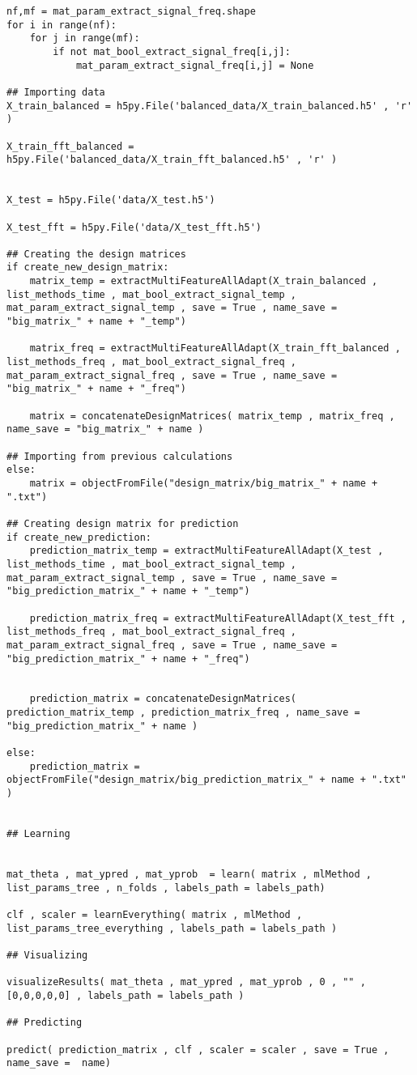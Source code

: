 \documentclass{article}
\begin{document}
\begin{lstlisting}
nf,mf = mat_param_extract_signal_freq.shape
for i in range(nf):
    for j in range(mf):
        if not mat_bool_extract_signal_freq[i,j]:
            mat_param_extract_signal_freq[i,j] = None

## Importing data
X_train_balanced = h5py.File('balanced_data/X_train_balanced.h5' , 'r' )

X_train_fft_balanced = h5py.File('balanced_data/X_train_fft_balanced.h5' , 'r' )


X_test = h5py.File('data/X_test.h5')

X_test_fft = h5py.File('data/X_test_fft.h5')

## Creating the design matrices
if create_new_design_matrix:
    matrix_temp = extractMultiFeatureAllAdapt(X_train_balanced , list_methods_time , mat_bool_extract_signal_temp , mat_param_extract_signal_temp , save = True , name_save = "big_matrix_" + name + "_temp")
    
    matrix_freq = extractMultiFeatureAllAdapt(X_train_fft_balanced , list_methods_freq , mat_bool_extract_signal_freq , mat_param_extract_signal_freq , save = True , name_save = "big_matrix_" + name + "_freq")
    
    matrix = concatenateDesignMatrices( matrix_temp , matrix_freq , name_save = "big_matrix_" + name )

## Importing from previous calculations
else:
    matrix = objectFromFile("design_matrix/big_matrix_" + name + ".txt")

## Creating design matrix for prediction
if create_new_prediction:
    prediction_matrix_temp = extractMultiFeatureAllAdapt(X_test , list_methods_time , mat_bool_extract_signal_temp , mat_param_extract_signal_temp , save = True , name_save = "big_prediction_matrix_" + name + "_temp")
    
    prediction_matrix_freq = extractMultiFeatureAllAdapt(X_test_fft , list_methods_freq , mat_bool_extract_signal_freq , mat_param_extract_signal_freq , save = True , name_save = "big_prediction_matrix_" + name + "_freq")
    
    
    prediction_matrix = concatenateDesignMatrices( prediction_matrix_temp , prediction_matrix_freq , name_save = "big_prediction_matrix_" + name )

else:
    prediction_matrix = objectFromFile("design_matrix/big_prediction_matrix_" + name + ".txt" )


## Learning


mat_theta , mat_ypred , mat_yprob  = learn( matrix , mlMethod , list_params_tree , n_folds , labels_path = labels_path)

clf , scaler = learnEverything( matrix , mlMethod , list_params_tree_everything , labels_path = labels_path )

## Visualizing

visualizeResults( mat_theta , mat_ypred , mat_yprob , 0 , "" , [0,0,0,0,0] , labels_path = labels_path )

## Predicting

predict( prediction_matrix , clf , scaler = scaler , save = True , name_save =  name)
\end{lstlisting}
\end{document}

